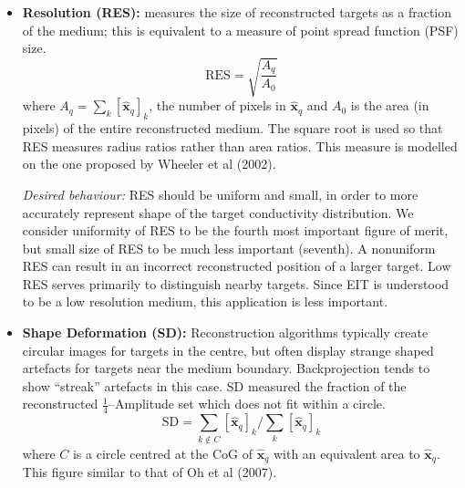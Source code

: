\documentclass[12pt]{iopart}
\newcommand{\xH}{\mbox{$\mathbf{\hat x}$}}
\begin{document}
\begin{itemize}
\hspace{5mm}
{\em Desired behaviour:}
PE should be small and show small variability for
targets at different radial positions. We consider
small and constant PE to be the second most important
figure of merit. If PE is variable, interpretation
of a distribution of air in the lungs becomes unreliable.
Sheffield backprojection has large PE near the
electrodes; this has resulted in cases where changes at
the electrodes are misinterpreted as being inside the body.

\item
{\bf Resolution (RES):}
measures the size of reconstructed targets as a fraction
of the medium; this is
equivalent to a measure of point spread function (PSF) size.
\begin{equation}
\mathrm{RES} = \sqrt{
 \frac{ A_q }
      { A_0 }
 }
\end{equation}
where $A_q =  \sum_k [\xH_q]_k$, the number
of pixels in $\xH_q$ and 
$A_0$ is the area (in pixels) of
the entire reconstructed medium. The square root is used 
so that RES measures radius ratios rather than area ratios.
This measure is modelled on the one proposed by
Wheeler et al (2002).

\hspace{5mm}
{\em Desired behaviour:}
RES should be uniform and small, in order to 
more accurately represent shape of the target conductivity
distribution. We consider uniformity of RES to be the
fourth most important figure of merit, but small size
of RES to be much less important (seventh). A nonuniform
RES can result in an incorrect reconstructed 
position of a larger target. Low RES serves primarily
to distinguish nearby targets. Since EIT is understood to
be a low resolution medium, this application is less important.

\item
{\bf Shape Deformation (SD):}
Reconstruction algorithms typically create circular
images for targets in the centre, but often display 
strange shaped artefacts for targets near the medium
boundary. Backprojection tends to show ``streak''
artefacts in this case.
SD measured the fraction of the reconstructed
$\frac{1}{4}$--Amplitude set which does not
fit within a circle.
\begin{equation}
\mathrm{SD} = \sum_{k\not\in C} [\xH_q]_k / 
              \sum_{k} [\xH_q]_k
\end{equation}
where $C$ is a circle centred at the CoG of $\xH_q$
with an equivalent area to $\xH_q$. This figure
similar to that of Oh et al (2007).


\end{itemize}
\end{document}
